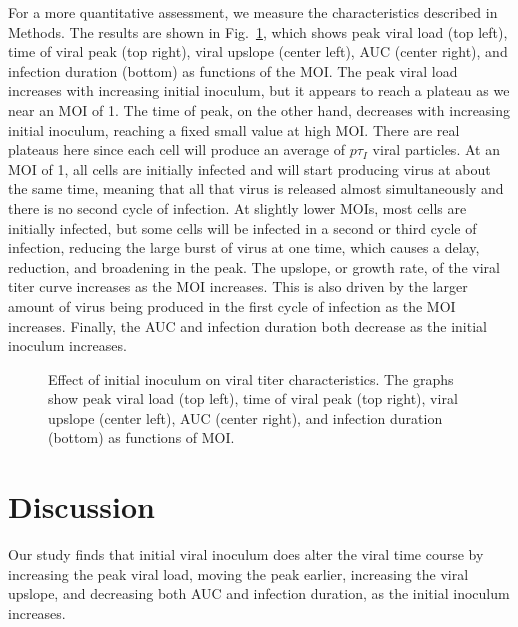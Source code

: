 For a more quantitative assessment, we measure the characteristics described in Methods. The results are shown in Fig.\ \ref{results}, which shows peak viral load (top left), time of viral peak (top right), viral upslope (center left), AUC (center right), and infection duration (bottom) as functions of the MOI. The peak viral load increases with increasing initial inoculum, but it appears to reach a plateau as we near an MOI of 1. The time of peak, on the other hand, decreases with increasing initial inoculum, reaching a fixed small value at high MOI. There are real plateaus here since each cell will produce an average of $p\tau_I$ viral particles. At an MOI of 1, all cells are initially infected and will start producing virus at about the same time, meaning that all that virus is released almost simultaneously and there is no second cycle of infection. At slightly lower MOIs, most cells are initially infected, but some cells will be infected in a second or third cycle of infection, reducing the large burst of virus at one time, which causes a delay, reduction, and broadening in the peak. The upslope, or growth rate, of the viral titer curve increases as the MOI increases. This is also driven by the larger amount of virus being produced in the first cycle of infection as the MOI increases. Finally, the AUC and infection duration both decrease as the initial inoculum increases.  
\begin{figure}[!h]
\begin{center}
\caption{Effect of initial inoculum on viral titer characteristics. The graphs show peak viral load (top left), time of viral peak (top right), viral upslope (center left), AUC (center right), and infection duration (bottom) as functions of MOI. \label{results}}
\end{center}
\end{figure}


\section{Discussion}

Our study finds that initial viral inoculum does alter the viral time course by increasing the peak viral load, moving the peak earlier, increasing the viral upslope, and decreasing both AUC and infection duration, as the initial inoculum increases. 


